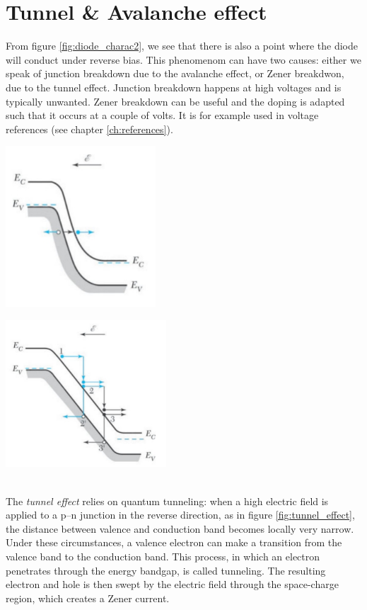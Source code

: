 \section{Tunnel \& Avalanche effect}
\label{sec:avalanche}
From figure \ref{fig:diode_charac2}, we see that there is also a point where the diode will conduct under reverse bias. This phenomenom can have two causes: either we speak of junction breakdown due to the avalanche effect, or Zener breakdwon, due to the tunnel effect. Junction breakdown happens at high voltages and is typically unwanted. Zener breakdown can be useful and the doping is adapted such that it occurs at a couple of volts. It is for example used in voltage references (see chapter \ref{ch:references}).\\
\begin{minipage}{.5\textwidth}
	\centering
	\includegraphics[height=6cm]{figures/ch01/tunnel_effect.jpg}
	\label{fig:tunnel_effect}
\end{minipage}
\begin{minipage}{.5\textwidth}
	\centering
	\includegraphics[width=6cm]{figures/ch01/avalanche.jpg}
	\label{fig:avalanche}
\end{minipage}\\
The \emph{tunnel effect} relies on quantum tunneling: when a high electric field is applied to a p–n junction in the reverse direction, as in figure \ref{fig:tunnel_effect}, the distance between valence and conduction band becomes locally very narrow. Under these circumstances, a valence electron can make a transition from the valence band to the conduction band. This process, in which an electron penetrates through the energy bandgap, is called tunneling. The resulting electron and hole is then swept by the electric field through the space-charge region, which creates a Zener current.\\
